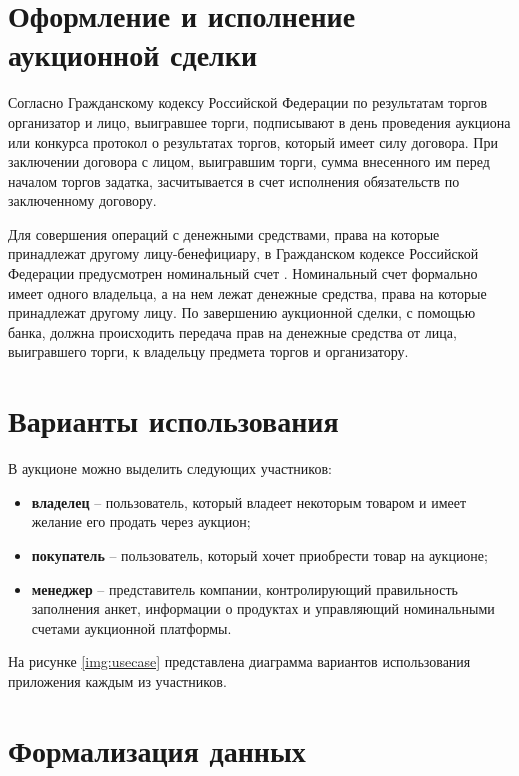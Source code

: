\section{Оформление и исполнение аукционной сделки}

Согласно Гражданскому кодексу Российской Федерации по результатам торгов организатор и лицо, выигравшее торги, подписывают в день проведения аукциона или конкурса протокол о результатах торгов, который имеет силу договора. При заключении договора с лицом, выигравшим торги, сумма внесенного им перед началом торгов задатка, засчитывается в счет исполнения обязательств по заключенному договору. \cite{lawauction} 

Для совершения операций с денежными средствами, права на которые принадлежат другому лицу-бенефициару, в Гражданском кодексе Российской Федерации предусмотрен номинальный счет \cite{lawnominalaccount}. Номинальный счет формально имеет одного владельца, а на нем лежат денежные средства, права на которые принадлежат другому лицу. По завершению аукционной сделки, с помощью банка, должна происходить передача прав на денежные средства от лица, выигравшего торги, к владельцу предмета торгов и организатору.

\section{Варианты использования}

В аукционе можно выделить следующих участников:
\begin{itemize}
    \item \textbf{владелец} -- пользователь, который владеет некоторым товаром и имеет желание его продать через аукцион;
    \item \textbf{покупатель} -- пользователь, который хочет приобрести товар на аукционе;
    \item \textbf{менеджер} -- представитель компании, контролирующий правильность заполнения анкет, информации о продуктах и управляющий номинальными счетами аукционной платформы.
\end{itemize}

На рисунке \ref{img:usecase} представлена диаграмма вариантов использования приложения каждым из участников.


\section{Формализация данных}

